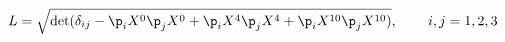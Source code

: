 \begin{equation}
L=\sqrt{\textup{det} (\delta_{ij}  - \p_i X^0 \p_j X^0
+ \p_i X^4 \p_j X^4
+ \p_i X^{10} \p_j X^{10} )}, \hspace{.3in} i,j=1,2,3
\label{spvortex}
\end{equation}

